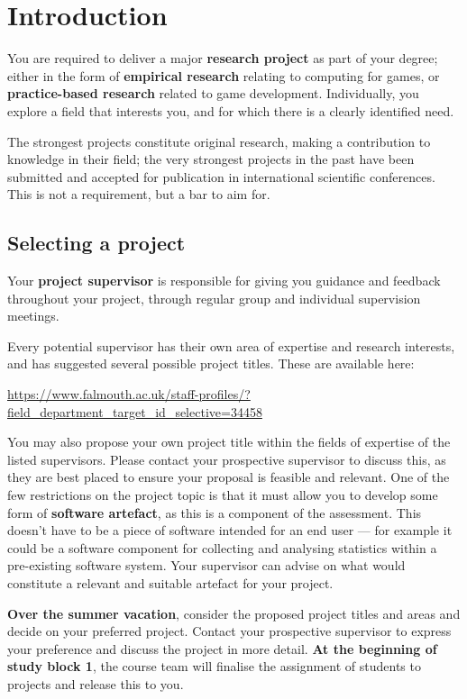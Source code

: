 \chapter{Introduction}

You are required to deliver a major \textbf{research project} as part of your degree;
either in the form of \textbf{empirical research} relating to computing for games,
or \textbf{practice-based research} related to game development.
Individually, you explore a field that interests you, and for which there is a clearly identified need.

The strongest projects constitute original research, making a contribution to knowledge in their field;
the very strongest projects in the past have been submitted and accepted for publication in international
scientific conferences. This is not a requirement, but a bar to aim for.

\section*{Selecting a project}

Your \textbf{project supervisor} is responsible for giving you guidance and feedback throughout your project,
through regular group and individual supervision meetings.

Every potential supervisor has their own area of expertise and research interests,
and has suggested several possible project titles.
These are available here:

\url{https://www.falmouth.ac.uk/staff-profiles/?field_department_target_id_selective=34458}

You may also propose your own project title within the fields of expertise of the listed supervisors.
Please contact your prospective supervisor to discuss this, as they are best placed to ensure your proposal
is feasible and relevant.
One of the few restrictions on the project topic is that it must allow you to develop some form of \textbf{software artefact},
as this is a component of the assessment.
This doesn't have to be a piece of software intended for an end user ---
for example it could be a software component for collecting and analysing statistics within a pre-existing software system.
Your supervisor can advise on what would constitute a relevant and suitable artefact for your project.

\textbf{Over the summer vacation}, consider the proposed project titles and areas and decide on your preferred project.
Contact your prospective supervisor to express your preference and discuss the project in more detail.
\textbf{At the beginning of study block 1}, the course team will finalise the assignment of students to projects
and release this to you.

